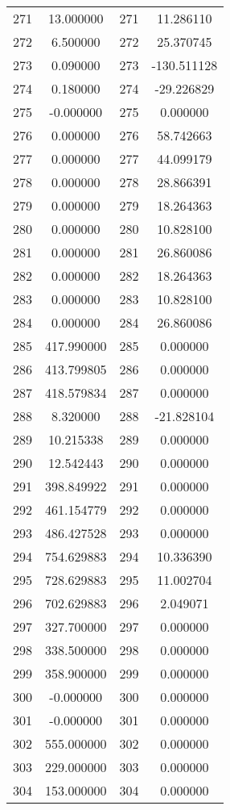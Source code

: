 \documentclass[12pt]{article}
\begin{document}
\begin{longtable}{@{}cccc@{}}
271 & 13.000000 & 271 & 11.286110 \\
272 & 6.500000 & 272 & 25.370745 \\
273 & 0.090000 & 273 & -130.511128 \\
274 & 0.180000 & 274 & -29.226829 \\
275 & -0.000000 & 275 & 0.000000 \\
276 & 0.000000 & 276 & 58.742663 \\
277 & 0.000000 & 277 & 44.099179 \\
278 & 0.000000 & 278 & 28.866391 \\
279 & 0.000000 & 279 & 18.264363 \\
280 & 0.000000 & 280 & 10.828100 \\
281 & 0.000000 & 281 & 26.860086 \\
282 & 0.000000 & 282 & 18.264363 \\
283 & 0.000000 & 283 & 10.828100 \\
284 & 0.000000 & 284 & 26.860086 \\
285 & 417.990000 & 285 & 0.000000 \\
286 & 413.799805 & 286 & 0.000000 \\
287 & 418.579834 & 287 & 0.000000 \\
288 & 8.320000 & 288 & -21.828104 \\
289 & 10.215338 & 289 & 0.000000 \\
290 & 12.542443 & 290 & 0.000000 \\
291 & 398.849922 & 291 & 0.000000 \\
292 & 461.154779 & 292 & 0.000000 \\
293 & 486.427528 & 293 & 0.000000 \\
294 & 754.629883 & 294 & 10.336390 \\
295 & 728.629883 & 295 & 11.002704 \\
296 & 702.629883 & 296 & 2.049071 \\
297 & 327.700000 & 297 & 0.000000 \\
298 & 338.500000 & 298 & 0.000000 \\
299 & 358.900000 & 299 & 0.000000 \\
300 & -0.000000 & 300 & 0.000000 \\
301 & -0.000000 & 301 & 0.000000 \\
302 & 555.000000 & 302 & 0.000000 \\
303 & 229.000000 & 303 & 0.000000 \\
304 & 153.000000 & 304 & 0.000000 \\

\end{longtable}
\end{document}
